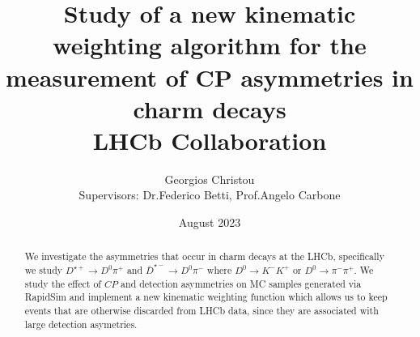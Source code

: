 \documentclass{article}
\title{\textbf{
        Study of a new kinematic weighting algorithm for the measurement of CP asymmetries in charm decays}
        \\
        LHCb Collaboration
}
\author{
        Georgios Christou
        \\
        Supervisors: Dr.\@ Federico Betti, Prof.\@ Angelo Carbone
}
\date{
        August 2023
}
\begin{document}
        \begin{figure}[t]
                \centering
                \hspace{1cm}
        \end{figure}

        \maketitle

        \begin{abstract}
                We investigate the asymmetries that occur in charm decays at the LHCb, specifically we study $D^{\star+}\to D^0\pi^+$ and $\bar{D}^{\star-}\to D^0\pi^-$ where $D^0\to K^-K^+$ or $D^0\to \pi^-\pi^+$.
                We study the effect of $CP$ and detection asymmetries on MC samples generated via RapidSim and implement a new kinematic weighting function which allows us to keep events that are otherwise discarded from LHCb data, since they are associated with large detection asymetries.
        \end{abstract}
        
        \pagebreak
\end{document}
